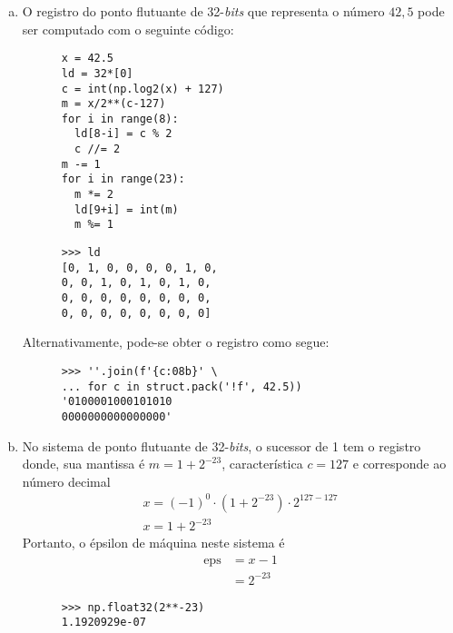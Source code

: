\begin{resol}
  \begin{enumerate}[a)]
  \item O registro do ponto flutuante de 32-{\it bits} que representa o número $42,5$ pode ser computado com o seguinte código:
    \begin{lstlisting}
      x = 42.5
      ld = 32*[0]
      c = int(np.log2(x) + 127)
      m = x/2**(c-127)
      for i in range(8):
        ld[8-i] = c % 2
        c //= 2
      m -= 1
      for i in range(23):
        m *= 2
        ld[9+i] = int(m)
        m %= 1
    \end{lstlisting}
    \begin{lstlisting}
      >>> ld
      [0, 1, 0, 0, 0, 0, 1, 0,
      0, 0, 1, 0, 1, 0, 1, 0,
      0, 0, 0, 0, 0, 0, 0, 0,
      0, 0, 0, 0, 0, 0, 0, 0]
    \end{lstlisting}

    Alternativamente, pode-se obter o registro como segue:
    \begin{lstlisting}
      >>> ''.join(f'{c:08b}' \
      ... for c in struct.pack('!f', 42.5))
      '0100001000101010
      0000000000000000'
    \end{lstlisting}

  \item No sistema de ponto flutuante de 32-{\it bits}, o sucessor de 1 tem o registro
    \begin{equation}
      [0 ~ | ~ 0 ~ 1 ~ 1 ~ \ldots ~ 1 ~ | ~ 0 ~ 0 ~ \ldots ~ 0 ~ 1]
    \end{equation}
    donde, sua mantissa é $m = 1 + 2^{-23}$, característica $c = 127$ e corresponde ao número decimal
    \begin{gather}
      x = (-1)^0\cdot (1 + 2^{-23})\cdot 2^{127-127}\\
      x = 1 + 2^{-23}
    \end{gather}
    Portanto, o épsilon de máquina neste sistema é
    \begin{align}
      \mathrm{eps} &= x - 1\\
                   &= 2^{-23}
    \end{align}

    \begin{lstlisting}
      >>> np.float32(2**-23)
      1.1920929e-07
    \end{lstlisting}
  \end{enumerate}
\end{resol}

\emconstrucao

